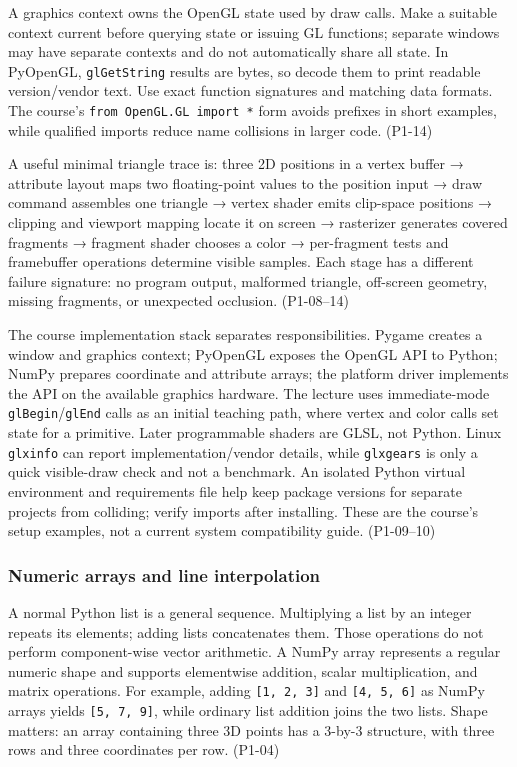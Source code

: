 A graphics context owns the OpenGL state used by draw calls. Make a suitable context current before querying state or issuing GL functions; separate windows may have separate contexts and do not automatically share all state. In PyOpenGL, \texttt{glGetString} results are bytes, so decode them to print readable version/vendor text. Use exact function signatures and matching data formats. The course's \texttt{from\ OpenGL.GL\ import\ *} form avoids prefixes in short examples, while qualified imports reduce name collisions in larger code. (P1-14)

A useful minimal triangle trace is: three 2D positions in a vertex buffer → attribute layout maps two floating-point values to the position input → draw command assembles one triangle → vertex shader emits clip-space positions → clipping and viewport mapping locate it on screen → rasterizer generates covered fragments → fragment shader chooses a color → per-fragment tests and framebuffer operations determine visible samples. Each stage has a different failure signature: no program output, malformed triangle, off-screen geometry, missing fragments, or unexpected occlusion. (P1-08--14)

The course implementation stack separates responsibilities. Pygame creates a window and graphics context; PyOpenGL exposes the OpenGL API to Python; NumPy prepares coordinate and attribute arrays; the platform driver implements the API on the available graphics hardware. The lecture uses immediate-mode \texttt{glBegin}/\texttt{glEnd} calls as an initial teaching path, where vertex and color calls set state for a primitive. Later programmable shaders are GLSL, not Python. Linux \texttt{glxinfo} can report implementation/vendor details, while \texttt{glxgears} is only a quick visible-draw check and not a benchmark. An isolated Python virtual environment and requirements file help keep package versions for separate projects from colliding; verify imports after installing. These are the course's setup examples, not a current system compatibility guide. (P1-09--10)

\subsubsection{Numeric arrays and line interpolation}\label{03-visual-computing-i-ch018-numeric-arrays-and-line-interpolation}

\hypertarget{03-visual-computing-i-ch018-numeric-arrays-and-line-interpolation}{}

A normal Python list is a general sequence. Multiplying a list by an integer repeats its elements; adding lists concatenates them. Those operations do not perform component-wise vector arithmetic. A NumPy array represents a regular numeric shape and supports elementwise addition, scalar multiplication, and matrix operations. For example, adding \texttt{{[}1,\ 2,\ 3{]}} and \texttt{{[}4,\ 5,\ 6{]}} as NumPy arrays yields \texttt{{[}5,\ 7,\ 9{]}}, while ordinary list addition joins the two lists. Shape matters: an array containing three 3D points has a 3-by-3 structure, with three rows and three coordinates per row. (P1-04)

